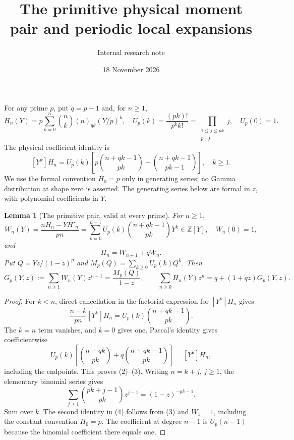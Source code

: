 \documentclass[11pt]{article}
\title{The primitive physical moment pair and periodic local expansions}
\author{Internal research note}\date{18 November 2026}
\newtheorem{lemma}{Lemma}\newtheorem{proposition}[lemma]{Proposition}\newtheorem{theorem}[lemma]{Theorem}\newtheorem{corollary}[lemma]{Corollary}
\begin{document}
\setlength{\emergencystretch}{1em}\maketitle
For any prime $p$, put $q=p-1$ and, for $n\ge1$,
\[
 H_n(Y)=p\sum_{k=0}^n\binom nk(n)_{qk}(Y/p)^k,\quad
 U_p(k)=\frac{(pk)!}{p^kk!}
       =\prod_{\substack{1\le j\le pk\\p\nmid j}}j,\quad U_p(0)=1.
\]
The physical coefficient identity is
\[
 [Y^k]H_n=U_p(k)
 \left[p\binom{n+qk-1}{pk}+\binom{n+qk-1}{pk-1}\right],
 \quad k\ge1.
 \tag{1}
\]
We use the formal convention $H_0=p$ only in generating series;
no Gamma distribution at shape zero is asserted.
The generating series below are formal in $z$, with polynomial
coefficients in $Y$.

\begin{lemma}[The primitive pair, valid at every prime]\label{lem:pair}
For $n\ge1$,
\[
 W_n(Y)=\frac{nH_n-YH'_n}{pn}
       =\sum_{k=0}^{n-1}U_p(k)
                  \binom{n+qk-1}{pk}Y^k\in\mathbb Z[Y],
 \quad W_n(0)=1,
 \tag{2}
\]
and
\[
                   H_n=W_{n+1}+qW_n.                    \tag{3}
\]
Put $Q=Yz/(1-z)^p$ and $M_p(Q)=\sum_{k\ge0}U_p(k)Q^k$.
Then
\[
 G_p(Y,z):=\sum_{n\ge1}W_n(Y)z^{n-1}
       =\frac{M_p(Q)}{1-z},\qquad
 \sum_{n\ge0}H_n(Y)z^n=q+(1+qz)G_p(Y,z).
 \tag{4}
\]
\end{lemma}
\begin{proof}
For $k<n$, direct cancellation in the factorial expression for
$[Y^k]H_n$ gives
\[
 \frac{n-k}{pn}[Y^k]H_n
 =U_p(k)\binom{n+qk-1}{pk}.
\]
The $k=n$ term vanishes, and $k=0$ gives one.
Pascal's identity gives coefficientwise
\[
 U_p(k)\left[\binom{n+qk}{pk}
          +q\binom{n+qk-1}{pk}\right]=[Y^k]H_n,
\]
including the endpoints. This proves (2)--(3).
Writing $n=k+j$, $j\ge1$, the elementary binomial series gives
\[
 \sum_{j\ge1}\binom{pk+j-1}{pk}z^{j-1}
                      =(1-z)^{-pk-1}.
\]
Sum over $k$. The second identity in (4) follows from (3)
and $W_1=1$, including the constant convention $H_0=p$.
The coefficient at degree $n-1$ is $U_p(n-1)$ because the
binomial coefficient there equals one.
\end{proof}
\end{document}
